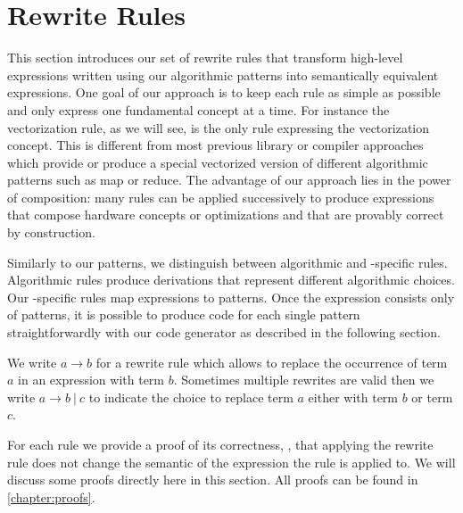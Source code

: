 \section{Rewrite Rules}
\label{section:rules}

This section introduces our set of rewrite rules that transform high-level expressions written using our algorithmic patterns into semantically equivalent expressions.
One goal of our approach is to keep each rule as simple as possible and only express one fundamental concept at a time.
For instance the vectorization rule, as we will see, is the only rule expressing the vectorization concept.
This is different from most previous library or compiler approaches which provide or produce a special vectorized version of different algorithmic patterns such as map or reduce.
The advantage of our approach lies in the power of composition:
many rules can be applied successively to produce expressions that compose hardware concepts or optimizations and that are provably correct by construction.

Similarly to our patterns, we distinguish between algorithmic and \OpenCL-specific rules.
Algorithmic rules produce derivations that represent different algorithmic choices.
Our \OpenCL-specific rules map expressions to \OpenCL patterns.
Once the expression consists only of \OpenCL patterns, it is possible to produce \OpenCL code for each single pattern straightforwardly with our code generator as described in the following section.

We write $a \rightarrow b$ for a rewrite rule which allows to replace the occurrence of term $a$ in an expression with term $b$.
Sometimes multiple rewrites are valid then we write $a \rightarrow b\ |\ c$ to indicate the choice to replace term $a$ either with term $b$ or term $c$.

For each rule we provide a proof of its correctness, \ie, that applying the rewrite rule does not change the semantic of the expression the rule is applied to.
We will discuss some proofs directly here in this section.
All proofs can be found in \autoref{chapter:proofs}.



